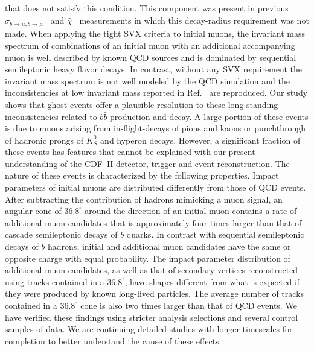 \documentclass[aps,prd,preprint,floatfix,nofootinbib,superscriptaddress,showpacs,amssymb]{revtex4}
\def\deg{^\circ}
\begin{document}
 that does not satisfy this condition. This component was present in previous 
 $\sigma_{b\rightarrow\mu,\bar{b}\rightarrow \mu}$~\cite{d0b2,2mucdf} and 
 $\bar{\chi}$~\cite{bmix} measurements in which this decay-radius requirement
 was not made. When applying the tight SVX criteria to initial muons,
 the invariant mass spectrum of combinations of an initial muon with an
 additional accompanying muon is well described by known QCD sources and 
 is dominated by sequential semileptonic heavy flavor decays. In contrast,
 without any SVX requirement the invariant mass spectrum is not well modeled
 by the QCD simulation and the inconsistencies at low invariant mass
 reported in Ref.~\cite{dilb} are reproduced. Our study shows that ghost
 events offer a plausible resolution to these long-standing inconsistencies
 related to $b\bar{b}$ production and decay. A large portion of these events
 is due to muons arising from in-flight-decays of pions and kaons or 
 punchthrough of hadronic prongs of $K^0_S$ and hyperon decays. However, 
 a significant fraction of these events has features that cannot be explained
 with our present understanding of the CDF~II detector, trigger and event
 reconstruction. The nature of these events is characterized by the 
 following properties. Impact parameters of initial muons are distributed
 differently from those of QCD events. After subtracting the contribution
 of hadrons mimicking a muon signal, an angular cone of 36.8$^{\deg}$ around
 the direction of an initial muon contains a rate of additional muon
 candidates that is approximately four times larger than that of cascade
 semileptonic decays of $b$ quarks. In contrast with sequential semileptonic
 decays of $b$ hadrons, initial and additional muon candidates have the same or
 opposite charge with equal probability. The impact parameter distribution
 of additional muon candidates, as well as that of secondary vertices
 reconstructed using tracks contained in a 36.8$^{\deg}$, have shapes
 different from what is expected if they were produced by known long-lived
 particles. The average number of tracks contained in a 36.8$^{\deg}$ cone
 is also two times larger than that of QCD events. We have verified these
 findings using stricter analysis selections and several control samples of
 data. We are continuing detailed studies with longer timescales for
 completion to better understand the cause of these effects.
\end{document}
